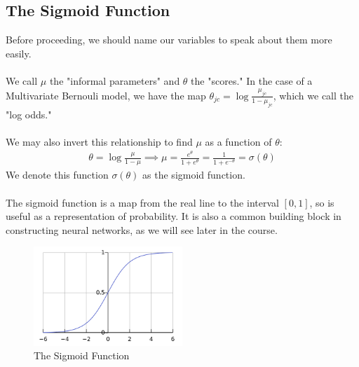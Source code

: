 \documentclass{article}
\begin{document}
\subsection{The Sigmoid Function}
Before proceeding, we should name our variables to speak about them more easily.  \\ \\
We call $\mu$ the "informal parameters" and $\theta$ the "scores." In the case of a Multivariate Bernouli model, we have the map $\theta_{jc} =  \log \frac{\mu_{jc}}{1-\mu_{jc}}$, which we call the "log odds."  \\ \\
We may also invert this relationship to find $\mu$ as a function of $\theta$: 
\begin{align}
    \theta = \log \frac{\mu}{1-\mu} \implies \mu = \frac{e^{\theta}}{1 + e^{\theta}} = \frac{1}{1 + e^{-\theta}} = \sigma(\theta)
\end{align}
We denote this function $\sigma(\theta)$ as the sigmoid function.  \\ \\
The sigmoid function is a map from the real line to the interval $[0,1]$, so is useful as a representation of probability. It is also a common building block in constructing neural networks, as we will see later in the course. 
\begin{figure}
\centering
\includegraphics[width=0.5\textwidth]{./sigmoid.png}
\caption{The Sigmoid Function}
\end{figure}
\end{document}
